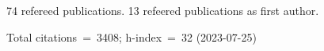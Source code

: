 74 refereed publications. 13 refeered publications as first author.

Total citations~=~3408; h-index~=~32 (2023-07-25)
